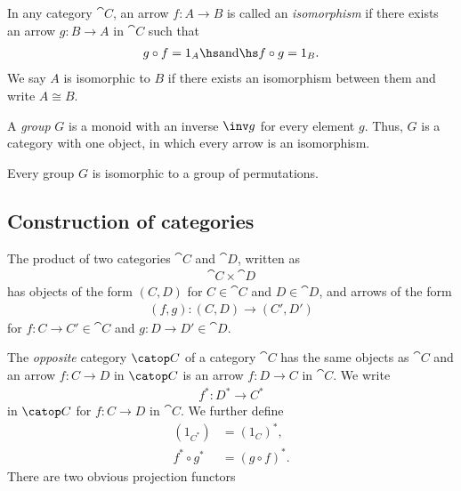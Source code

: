 \documentclass{article}
\begin{document}
\begin{definition}
    In any category $\cat{C}$, an arrow $f:A\to B$ is called an
    \emph{isomorphism} if there exists an arrow $g:B\to A$ in
    $\cat{C}$ such that
    \begin{align*}
        g\circ f = 1_A\hs\text{and}\hs f\circ g = 1_B.
    \end{align*}
    We say $A$ is isomorphic to $B$ if there exists an isomorphism
    between them and write $A\cong B$.
\end{definition}

\begin{definition}
    A \emph{group} $G$ is a monoid with an inverse $\inv g$ for every element $g$.
    Thus, $G$ is a category with one object, in which every arrow is an isomorphism.
\end{definition}

\begin{theorem}[Cayley]
    Every group $G$ is isomorphic to a group of permutations.
\end{theorem}



\subsection{Construction of categories}

\begin{definition}
    The product of two categories $\cat{C}$ and $\cat{D}$, written
    as
    \begin{align*}
        \cat{C}\times\cat{D}
    \end{align*}
    has objects of the form $(C,D)$ for $C\in\cat{C}$ and $D\in\cat{D}$,
    and arrows of the form
    \begin{align*}
        (f,g):(C,D)\to (C',D')
    \end{align*}
    for $f:C\to C'\in\cat{C}$ and $g:D\to D'\in\cat{D}$.
\end{definition}

\begin{definition}
    The \emph{opposite} category $\catop C$ of a category $\cat C$ has
    the same objects as $\cat C$ and an arrow $f:C\to D$ in $\catop C$
    is an arrow $f:D\to C$ in $\cat C$. We write
    \begin{align*}
        f^* : D^* \to C^*
    \end{align*}
    in $\catop C$ for $f:C\to D$ in $\cat C$. We further define
    \begin{align*}
        (1_{C^*})    & = (1_C)^*,      \\
        f^*\circ g^* & = (g\circ f)^*.
    \end{align*}
    There are two obvious projection functors
    \begin{center}
    \end{center}
\end{definition}
\end{document}
